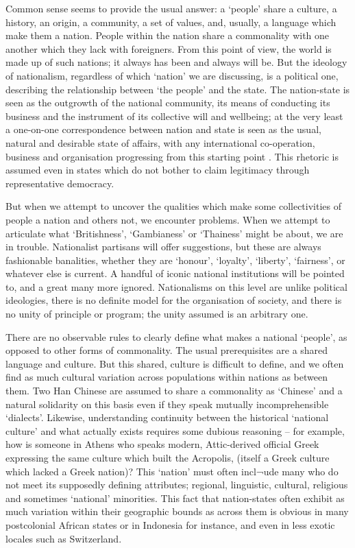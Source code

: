 Common sense seems to provide the usual answer: a ‘people’ share a culture, a history, an origin, a community, a set of values, and, usually, a language which make them a nation. People within the nation share a commonality with one another which they lack with foreigners. From this point of view, the world is made up of such nations; it always has been and always will be. But the ideology of nationalism, regardless of which ‘nation’ we are discussing, is a political one, describing the relationship between ‘the people’ and the state. The nation-state is seen as the outgrowth of the national community, its means of conducting its business and the instrument of its collective will and wellbeing; at the very least a one-on-one correspondence between nation and state is seen as the usual, natural and desirable state of affairs, with any international co-operation, business and organisation progressing from this starting point . This rhetoric is assumed even in states which do not bother to claim legitimacy through representative democracy.

But when we attempt to uncover the qualities which make some collectivities of people a nation and others not, we encounter problems. When we attempt to articulate what ‘Britishness’, ‘Gambianess’ or ‘Thainess’ might be about, we are in trouble. Nationalist partisans will offer suggestions, but these are always fashionable banalities, whether they are ‘honour’, ‘loyalty’, ‘liberty’, ‘fairness’, or whatever else is current. A handful of iconic national institutions will be pointed to, and a great many more ignored. Nationalisms on this level are unlike political ideologies, there is no definite model for the organisation of society, and there is no unity of principle or program; the unity assumed is an arbitrary one.

There are no observable rules to clearly define what makes a national ‘people’, as opposed to other forms of commonality. The usual prerequisites are a shared language and culture. But this shared, culture is difficult to define, and we often find as much cultural variation across populations within nations as between them. Two Han Chinese are assumed to share a commonality as ‘Chinese’ and a natural solidarity on this basis even if they speak mutually incomprehensible ‘dialects’. Likewise, understanding continuity between the historical ‘national culture’ and what actually exists requires some dubious reasoning – for example, how is someone in Athens who speaks modern, Attic-derived official Greek expressing the same culture which built the Acropolis, (itself a Greek culture which lacked a Greek nation)? This ‘nation’ must often incl¬ude many who do not meet its supposedly defining attributes; regional, linguistic, cultural, religious and sometimes ‘national’ minorities. This fact that nation-states often exhibit as much variation within their geographic bounds as across them is obvious in many postcolonial African states or in Indonesia for instance, and even in less exotic locales such as Switzerland.

